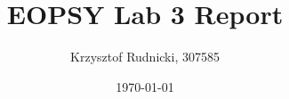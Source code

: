 \documentclass{article}
\begin{document}
\title{EOPSY Lab 3 Report}
\author{Krzysztof Rudnicki, 307585}
\date{\today}
\maketitle
	
	
	
	
	
	
	
	
\end{document}
